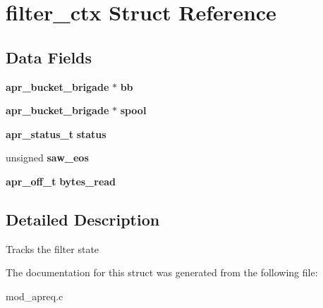 \section{filter\_\-ctx  Struct Reference}
\label{structfilter__ctx}
\subsection*{Data Fields}
\begin{CompactItemize}
\item 
{}
{\bf apr\_\-bucket\_\-brigade} $\ast$ {\bf bb}\label{structfilter__ctx_m0}

\item 
{}
{\bf apr\_\-bucket\_\-brigade} $\ast$ {\bf spool}\label{structfilter__ctx_m1}

\item 
{}
{\bf apr\_\-status\_\-t} {\bf status}\label{structfilter__ctx_m2}

\item 
{}
unsigned {\bf saw\_\-eos}\label{structfilter__ctx_m3}

\item 
{}
{\bf apr\_\-off\_\-t} {\bf bytes\_\-read}\label{structfilter__ctx_m4}

\end{CompactItemize}


\subsection{Detailed Description}
Tracks the filter state 



The documentation for this struct was generated from the following file:\begin{CompactItemize}
\item 
mod\_\-apreq.c\end{CompactItemize}
